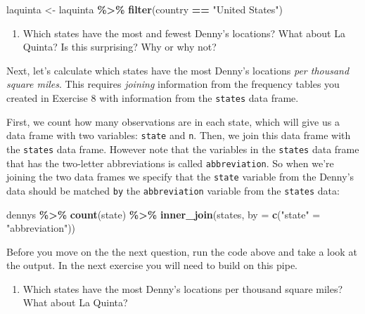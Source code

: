 \documentclass[
]{article}
\newenvironment{Shaded}{\begin{snugshade}}{\end{snugshade}}
\newcommand{\AttributeTok}[1]{\textcolor[rgb]{0.13,0.29,0.53}{#1}}
\newcommand{\FunctionTok}[1]{\textcolor[rgb]{0.13,0.29,0.53}{\textbf{#1}}}
\newcommand{\NormalTok}[1]{#1}
\newcommand{\OtherTok}[1]{\textcolor[rgb]{0.56,0.35,0.01}{#1}}
\newcommand{\SpecialCharTok}[1]{\textcolor[rgb]{0.81,0.36,0.00}{\textbf{#1}}}
\newcommand{\StringTok}[1]{\textcolor[rgb]{0.31,0.60,0.02}{#1}}
\providecommand{\tightlist}{%
  \setlength{\itemsep}{0pt}\setlength{\parskip}{0pt}}
\begin{document}
\begin{Shaded}
\begin{Highlighting}[]
\NormalTok{laquinta }\OtherTok{\textless{}{-}}\NormalTok{ laquinta }\SpecialCharTok{\%\textgreater{}\%}
  \FunctionTok{filter}\NormalTok{(country }\SpecialCharTok{==} \StringTok{"United States"}\NormalTok{)}
\end{Highlighting}
\end{Shaded}

\begin{enumerate}
\def\labelenumi{\arabic{enumi}.}
\setcounter{enumi}{8}
\tightlist
\item
  Which states have the most and fewest Denny's locations? What about La
  Quinta? Is this surprising? Why or why not?
\end{enumerate}

Next, let's calculate which states have the most Denny's locations
\emph{per thousand square miles}. This requires \emph{joining}
information from the frequency tables you created in Exercise 8 with
information from the \texttt{states} data frame.

First, we count how many observations are in each state, which will give
us a data frame with two variables: \texttt{state} and \texttt{n}. Then,
we join this data frame with the \texttt{states} data frame. However
note that the variables in the \texttt{states} data frame that has the
two-letter abbreviations is called \texttt{abbreviation}. So when we're
joining the two data frames we specify that the \texttt{state} variable
from the Denny's data should be matched \texttt{by} the
\texttt{abbreviation} variable from the \texttt{states} data:

\begin{Shaded}
\begin{Highlighting}[]
\NormalTok{dennys }\SpecialCharTok{\%\textgreater{}\%}
  \FunctionTok{count}\NormalTok{(state) }\SpecialCharTok{\%\textgreater{}\%}
  \FunctionTok{inner\_join}\NormalTok{(states, }\AttributeTok{by =} \FunctionTok{c}\NormalTok{(}\StringTok{"state"} \OtherTok{=} \StringTok{"abbreviation"}\NormalTok{))}
\end{Highlighting}
\end{Shaded}

Before you move on the the next question, run the code above and take a
look at the output. In the next exercise you will need to build on this
pipe.

\begin{enumerate}
\def\labelenumi{\arabic{enumi}.}
\setcounter{enumi}{9}
\tightlist
\item
  Which states have the most Denny's locations per thousand square
  miles? What about La Quinta?
\end{enumerate}
\end{document}
